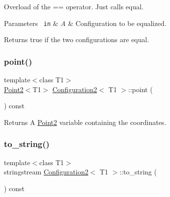 Overload of the == operator. Just calls {\ttfamily equal}. 


\begin{DoxyParams}[1]{Parameters}
\mbox{\texttt{ in}}  & {\em A} & Configuration to be equalized. \\
\hline
\end{DoxyParams}
\begin{DoxyReturn}{Returns}
true if the two configurations are equal. 
\end{DoxyReturn}
\mbox{\label{class_configuration2_a15ce37ad4eae9f4a980fc3578765984d}} 
\subsubsection{\texorpdfstring{point()}{point()}}
{\footnotesize\ttfamily template$<$class T1$>$ \\
\mbox{\hyperlink{class_point2}{Point2}}$<$T1$>$ \mbox{\hyperlink{class_configuration2}{Configuration2}}$<$ T1 $>$\+::point (\begin{DoxyParamCaption}{ }\end{DoxyParamCaption}) const\hspace{0.3cm}{\ttfamily [inline]}}

\begin{DoxyReturn}{Returns}
A {\ttfamily \mbox{\hyperlink{class_point2}{Point2}}} variable containing the coordinates. 
\end{DoxyReturn}
\mbox{\label{class_configuration2_ac68ba3be6be597763a5caa4bd7efa3d8}} 
\subsubsection{\texorpdfstring{to\_string()}{to\_string()}}
{\footnotesize\ttfamily template$<$class T1$>$ \\
stringstream \mbox{\hyperlink{class_configuration2}{Configuration2}}$<$ T1 $>$\+::to\+\_\+string (\begin{DoxyParamCaption}{ }\end{DoxyParamCaption}) const\hspace{0.3cm}{\ttfamily [inline]}}




